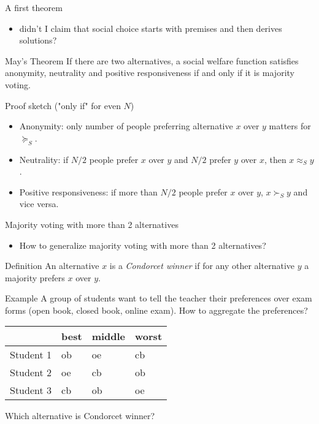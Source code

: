 \documentclass[bigger]{beamer}
\begin{document}
\begin{frame}[label={sec:orgdced17f}]{A first theorem}
\begin{itemize}
\item didn't I claim that social choice starts with premises and then derives solutions?
\end{itemize}

\begin{block}{May's Theorem}
If there are two alternatives, a social welfare function satisfies anonymity, neutrality and positive responsiveness if and only if it is majority voting. 
\end{block}
\begin{block}{Proof sketch ("only if" for even \(N\))}
\begin{itemize}
\item Anonymity: only number of people preferring alternative \(x\) over \(y\) matters for \(\succeq_S\).
\item Neutrality: if \(N/2\) people prefer \(x\) over \(y\) and \(N/2\) prefer \(y\) over \(x\), then \(x\approx_S y\).
\item Positive responsiveness: if more than \(N/2\) people prefer \(x\) over \(y\), \(x\succ_S y\) and vice versa.
\end{itemize}
\end{block}
\end{frame}
\begin{frame}[label={sec:org695ec98}]{Majority voting with more than 2 alternatives}
\begin{itemize}
\item How to generalize majority voting with more than 2 alternatives?
\end{itemize}
\begin{block}{Definition}
An alternative \(x\) is a \emph{Condorcet winner} if for any other alternative \(y\) a majority prefers \(x\) over \(y\).
\end{block}
\begin{block}{Example}
A group of students want to tell the teacher their preferences over exam forms (open book, closed book, online exam). How to aggregate the preferences?
\begin{center}
\begin{tabular}{l|lll}
 & best & middle & worst\\
\hline
Student 1 & ob & oe & cb\\
Student 2 & oe & cb & ob\\
Student 3 & cb & ob & oe\\
\end{tabular}
\end{center}
Which alternative is Condorcet winner?
\end{block}
\end{frame}
\end{document}
